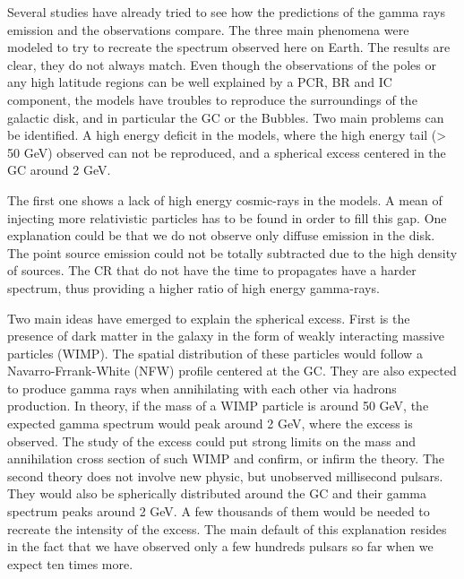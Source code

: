 Several studies have already tried to see how the predictions of the gamma rays emission and the observations compare. The three main phenomena were modeled to try to recreate the spectrum observed here on Earth. The results are clear, they do not always match.
Even though the observations of the poles or any high latitude regions can be well explained by a PCR, BR and IC component, the models have troubles to reproduce the surroundings of the galactic disk, and in particular the GC or the Bubbles. 
Two main problems can be identified. A high energy deficit in the models, where the high energy tail (> 50 GeV) observed can not be reproduced, and a spherical excess centered in the GC around 2 GeV.

The first one shows a lack of high energy cosmic-rays in the models. A mean of injecting more relativistic particles has to be found in order to fill this gap. One explanation could be that we do not observe only diffuse emission in the disk. The point source emission could not be totally subtracted due to the high density of sources. The CR that do not have the time to propagates have a harder spectrum, thus providing a higher ratio of high energy gamma-rays.

Two main ideas have emerged to explain the spherical excess.
First is the presence of dark matter in the galaxy in the form of weakly interacting massive particles (WIMP). The spatial distribution of these particles would follow a Navarro-Frrank-White (NFW) profile centered at the GC. They are also expected to produce gamma rays when annihilating with each other via hadrons production. In theory, if the mass of a WIMP particle is around 50 GeV, the expected gamma spectrum would peak around 2 GeV, where the excess is observed. 
The study of the excess could put strong limits on the mass and annihilation cross section of such WIMP and confirm, or infirm the theory.
The second theory does not involve new physic, but unobserved millisecond pulsars. They would also be spherically distributed around the GC and their gamma spectrum peaks around 2 GeV. A few thousands of them would be needed to recreate the intensity of the excess. The main default of this explanation resides in the fact that we have observed only a few hundreds pulsars so far when we expect ten times more.







































